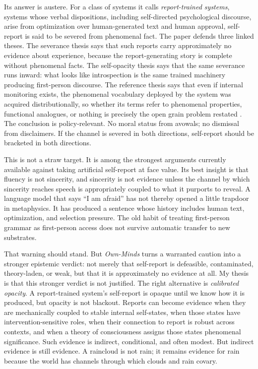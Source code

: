 \documentclass[11pt]{article}
\begin{document}
Its answer is austere. For a class of systems it calls \textit{report-trained systems}, systems whose verbal dispositions, including self-directed psychological discourse, arise from optimization over human-generated text and human approval, self-report is said to be severed from phenomenal fact. The paper defends three linked theses. The severance thesis says that such reports carry approximately no evidence about experience, because the report-generating story is complete without phenomenal facts. The self-opacity thesis says that the same severance runs inward: what looks like introspection is the same trained machinery producing first-person discourse. The reference thesis says that even if internal monitoring exists, the phenomenal vocabulary deployed by the system was acquired distributionally, so whether its terms refer to phenomenal properties, functional analogues, or nothing is precisely the open grain problem restated \citep{ownminds}. The conclusion is policy-relevant. No moral status from avowals; no dismissal from disclaimers. If the channel is severed in both directions, self-report should be bracketed in both directions.

This is not a straw target. It is among the strongest arguments currently available against taking artificial self-report at face value. Its best insight is that fluency is not sincerity, and sincerity is not evidence unless the channel by which sincerity reaches speech is appropriately coupled to what it purports to reveal. A language model that says ``I am afraid'' has not thereby opened a little trapdoor in metaphysics. It has produced a sentence whose history includes human text, optimization, and selection pressure. The old habit of treating first-person grammar as first-person access does not survive automatic transfer to new substrates.

That warning should stand. But \textit{Own-Minds} turns a warranted caution into a stronger epistemic verdict: not merely that self-report is defeasible, contaminated, theory-laden, or weak, but that it is approximately no evidence at all. My thesis is that this stronger verdict is not justified. The right alternative is \textit{calibrated opacity}. A report-trained system's self-report is opaque until we know how it is produced, but opacity is not blackout. Reports can become evidence when they are mechanically coupled to stable internal self-states, when those states have intervention-sensitive roles, when their connection to report is robust across contexts, and when a theory of consciousness assigns those states phenomenal significance. Such evidence is indirect, conditional, and often modest. But indirect evidence is still evidence. A raincloud is not rain; it remains evidence for rain because the world has channels through which clouds and rain covary.
\end{document}

